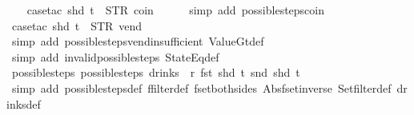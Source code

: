 \begin{isabellebody}
%
\isadelimproof
\ \ %
\endisadelimproof
%
\isatagproof
{}\isamarkupfalse%
\ {\isacharparenleft}case{\isacharunderscore}tac\ {\isachardoublequoteopen}shd\ t\ {\isacharequal}\ {\isacharparenleft}STR\ {\isacharprime}{\isacharprime}coin{\isacharprime}{\isacharprime}{\isacharcomma}\ {\isacharbrackleft}{\isacharbrackright}{\isacharparenright}{\isachardoublequoteclose}{\isacharparenright}\isanewline
\ \ \ \isamarkupfalse%
\ {\isacharparenleft}simp\ add{\isacharcolon}\ possible{\isacharunderscore}steps{\isacharunderscore}coin{\isacharparenright}\isanewline
\ \ \isamarkupfalse%
\ {\isacharparenleft}case{\isacharunderscore}tac\ {\isachardoublequoteopen}shd\ t\ {\isacharequal}\ {\isacharparenleft}STR\ {\isacharprime}{\isacharprime}vend{\isacharprime}{\isacharprime}{\isacharcomma}\ {\isacharbrackleft}{\isacharbrackright}{\isacharparenright}{\isachardoublequoteclose}{\isacharparenright}\isanewline
\ \ \ \isamarkupfalse%
\ {\isacharparenleft}simp\ add{\isacharcolon}\ possible{\isacharunderscore}steps{\isacharunderscore}vend{\isacharunderscore}insufficient\ ValueGt{\isacharunderscore}def{\isacharparenright}\isanewline
\ \ \isamarkupfalse%
\ {\isacharparenleft}simp\ add{\isacharcolon}\ invalid{\isacharunderscore}possible{\isacharunderscore}steps{\isacharunderscore}{}\ StateEq{\isacharunderscore}def{\isacharparenright}%
\endisatagproof
{\isafoldproof}%
%
\isadelimproof
\isanewline
%
\endisadelimproof
\isanewline
{}\isamarkupfalse%
\ possible{\isacharunderscore}steps{\isacharunderscore}{}{\isacharcolon}\ {\isachardoublequoteopen}possible{\isacharunderscore}steps\ drinks\ {}\ r\ {\isacharparenleft}fst\ {\isacharparenleft}shd\ t{\isacharparenright}{\isacharparenright}\ {\isacharparenleft}snd\ {\isacharparenleft}shd\ t{\isacharparenright}{\isacharparenright}\ {\isacharequal}\ {\isacharbraceleft}{\isacharbar}{\isacharbar}{\isacharbraceright}{\isachardoublequoteclose}\isanewline
%
\isadelimproof
\ \ %
\endisadelimproof
%
\isatagproof
{}\isamarkupfalse%
\ {\isacharparenleft}simp\ add{\isacharcolon}\ possible{\isacharunderscore}steps{\isacharunderscore}def\ ffilter{\isacharunderscore}def\ fset{\isacharunderscore}both{\isacharunderscore}sides\ Abs{\isacharunderscore}fset{\isacharunderscore}inverse\ Set{\isachardot}filter{\isacharunderscore}def\ drinks{\isacharunderscore}def{\isacharparenright}%
\endisatagproof
{\isafoldproof}%
%
\isadelimproof
\isanewline
%
\endisadelimproof
\isanewline
{}\isamarkupfalse%

\end{isabellebody}
